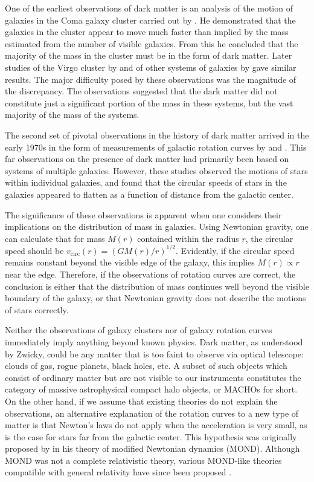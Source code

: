 One of the earliest observations of dark matter is an analysis of the motion of galaxies in the Coma galaxy cluster carried out by \textcite{Zwicky1933}. He demonstrated that the galaxies in the cluster appear to move much faster than implied by the mass estimated from the number of visible galaxies. From this he concluded that the majority of the mass in the cluster must be in the form of dark matter. Later studies of the Virgo cluster by \textcite{Smith1936} and of other systems of galaxies by \textcite{Holmberg1937} gave similar results. The major difficulty posed by these observations was the magnitude of the discrepancy. The observations suggested that the dark matter did not constitute just a significant portion of the mass in these systems, but the vast majority of the mass of the systems.

The second set of pivotal observations in the history of dark matter arrived in the early 1970s in the form of measurements of galactic rotation curves by \textcite{RubinFord1970} and \textcite{Freeman1970}. This far observations on the presence of dark matter had primarily been based on systems of multiple galaxies. However, these studies observed the motions of stars within individual galaxies, and found that the circular speeds of stars in the galaxies appeared to flatten as a function of distance from the galactic center.

The significance of these observations is apparent when one considers their implications on the distribution of mass in galaxies. Using Newtonian gravity, one can calculate that for mass $M(r)$ contained within the radius $r$, the circular speed should be $v_\text{circ}(r)=(GM(r)/r)^{1/2}$. Evidently, if the circular speed remains constant beyond the visible edge of the galaxy, this implies $M(r)\propto r$ near the edge. Therefore, if the observations of rotation curves are correct, the conclusion is either that the distribution of mass continues well beyond the visible boundary of the galaxy, or that Newtonian gravity does not describe the motions of stars correctly.

Neither the observations of galaxy clusters nor of galaxy rotation curves immediately imply anything beyond known physics. Dark matter, as understood by Zwicky, could be any matter that is too faint to observe via optical telescope: clouds of gas, rogue planets, black holes, etc. A subset of such objects which consist of ordinary matter but are not visible to our instruments constitutes the category of massive astrophysical compact halo objects, or MACHOs for short. On the other hand, if we assume that existing theories do not explain the observations, an alternative explanation of the rotation curves to a new type of matter is that Newton's laws do not apply when the acceleration is very small, as is the case for stars far from the galactic center. This hypothesis was originally proposed by \textcite{Milgrom1983} in his theory of modified Newtonian dynamics (MOND). Although MOND was not a complete relativistic theory, various MOND-like theories compatible with general relativity have since been proposed \parencites{Bekenstein2004, Milgrom2009, SkordisZlosnik2021}.

